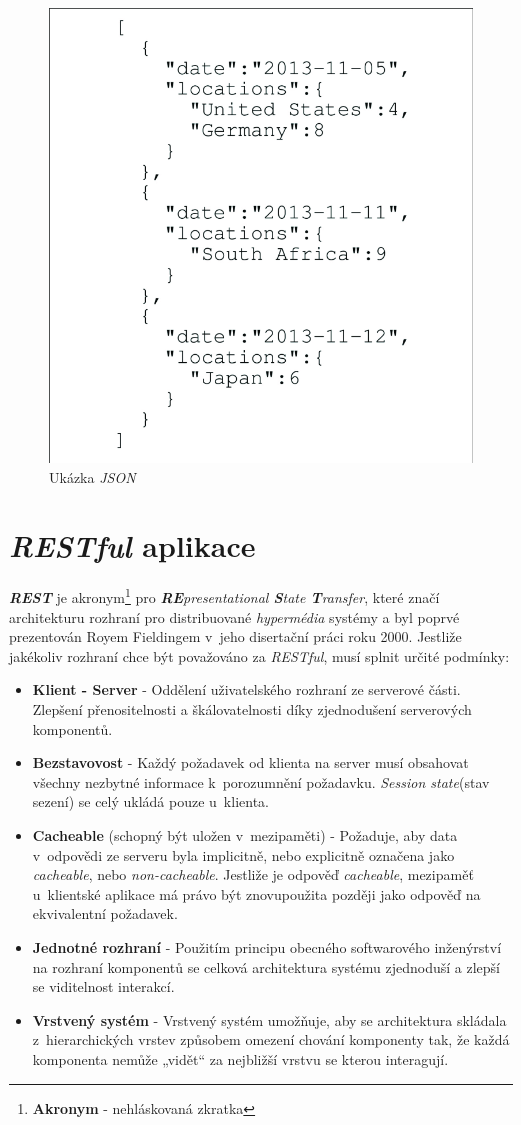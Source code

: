 \begin{figure}[hbt]
  \centering
  \includegraphics[width=.45 \linewidth]{obrazky-figures/json_example.png}
  \caption{Ukázka \emph{JSON}}
  \label{figure:json}
\end{figure}

\newpage
\section{\emph{RESTful} aplikace}
\label{terminy:restful}
\textbf{\emph{REST}} je akronym\footnote{\textbf{Akronym} - nehláskovaná zkratka} pro \emph{\textbf{RE}presentational \textbf{S}tate \textbf{T}ransfer},
které značí architekturu rozhraní pro distribuované \emph{hypermédia} systémy a byl poprvé prezentován Royem Fieldingem v~jeho disertační práci roku 2000.
\newline
\newline
Jestliže jakékoliv rozhraní chce být považováno za \emph{RESTful}, musí splnit určité podmínky:
\begin{itemize}
  \item \textbf{Klient - Server} - Oddělení uživatelského rozhraní ze serverové části.
        Zlepšení přenositelnosti a škálovatelnosti díky zjednodušení serverových komponentů.
  \item \textbf{Bezstavovost} - Každý požadavek od klienta na server musí obsahovat všechny nezbytné informace k~porozumnění požadavku.
        \emph{Session state}(stav sezení) se celý ukládá pouze u~klienta.
  \item \textbf{Cacheable} (schopný být uložen v~mezipaměti) - Požaduje, aby data v~odpovědi ze serveru byla implicitně, nebo explicitně označena jako \emph{cacheable}, nebo \emph{non-cacheable}.
        Jestliže je odpověď \emph{cacheable}, mezipaměť u~klientské aplikace má právo být znovupoužita později jako odpověď na ekvivalentní požadavek.
  \item \textbf{Jednotné rozhraní} - Použitím principu obecného softwarového inženýrství na rozhraní komponentů se celková architektura systému zjednoduší a zlepší se viditelnost interakcí.
  \item \textbf{Vrstvený systém} - Vrstvený systém umožňuje, aby se architektura skládala z~hierarchických vrstev způsobem omezení chování komponenty tak, že každá komponenta nemůže „vidět“ za nejbližší vrstvu se kterou interagují.
\end{itemize}

